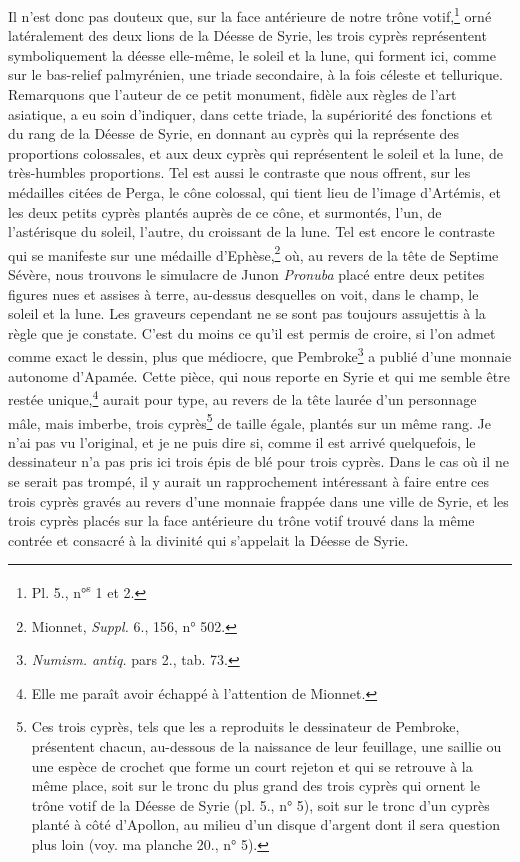 \documentclass{article}
\begin{document}
Il n'est donc pas douteux que, sur la face antérieure de notre trône votif,\footnote{Pl. 5., n°\textsuperscript{s} 1 et 2.} orné latéralement des deux lions de la Déesse de Syrie, les trois cyprès représentent symboliquement la déesse elle-même, le soleil et la lune, qui forment ici, comme sur le bas-relief palmyrénien, une triade secondaire, à la fois céleste et tellurique. Remarquons que l'auteur de ce petit monument, fidèle aux règles de l'art asiatique, a eu soin d'indiquer, dans cette triade, la supériorité des fonctions et du rang de la Déesse de Syrie, en donnant au cyprès qui la représente des proportions colossales, et aux deux cyprès qui représentent le soleil et la lune, de très-humbles proportions. Tel est aussi le contraste que nous offrent, sur les médailles citées de Perga, le cône colossal, qui tient lieu de l'image d'Artémis, et les deux petits cyprès plantés auprès de ce cône, et surmontés, l'un, de l'astérisque du soleil, l'autre, du croissant de la lune. Tel est encore le contraste qui se manifeste sur une médaille d'Ephèse,\footnote{Mionnet, \emph{Suppl.} 6., 156, n° 502.} où, au revers de la tête de Septime Sévère, nous trouvons le simulacre de Junon \emph{Pronuba} placé entre deux petites figures nues et assises à terre, au-dessus desquelles on voit, dans le champ, le soleil et la lune. Les graveurs cependant ne se sont pas toujours assujettis à la règle que je constate. C'est du moins ce qu'il est permis de croire, si l'on admet comme exact le dessin, plus que médiocre, que Pembroke\footnote{\emph{Numism. antiq.} pars 2., tab. 73.} a publié d'une monnaie autonome d'Apamée. Cette pièce, qui nous reporte en Syrie et qui me semble être restée unique,\footnote{Elle me paraît avoir échappé à l'attention de Mionnet.} aurait pour type, au revers de la tête laurée d'un personnage mâle, mais imberbe, trois cyprès\footnote{Ces trois cyprès, tels que les a reproduits le dessinateur de Pembroke, présentent chacun, au-dessous de la naissance de leur feuillage, une saillie ou une espèce de crochet que forme un court rejeton et qui se retrouve à la même place, soit sur le tronc du plus grand des trois cyprès qui ornent le trône votif de la Déesse de Syrie (pl. 5., n° 5), soit sur le tronc d'un cyprès planté à côté d'Apollon, au milieu d'un disque d'argent dont il sera question plus loin (voy. ma planche 20., n° 5).} de taille égale, plantés sur un même rang. Je n'ai pas vu l'original, et je ne puis dire si, comme il est arrivé quelquefois, le dessinateur n'a pas pris ici trois épis de blé pour trois cyprès. Dans le cas où il ne se serait pas trompé, il y aurait un rapprochement intéressant à faire entre ces trois cyprès gravés au revers d'une monnaie frappée dans une ville de Syrie, et les trois cyprès placés sur la face antérieure du trône votif trouvé dans la même contrée et consacré à la divinité qui s'appelait la Déesse de Syrie.
\end{document}
